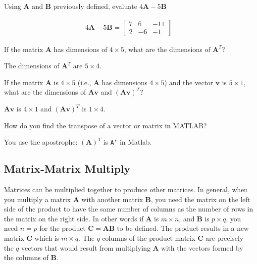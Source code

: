 \begin{prob}
Using $\mathbf{A}$ and $\mathbf{B}$ previously defined, evaluate $4\mathbf{A} - 5\mathbf{B}$
\end{prob}
\begin{sol}
\begin{align}4\mathbf{A} - 5\mathbf{B} =
\begin{bmatrix}
7 & 6 & -11\\
2 & -6 & -1
\end{bmatrix}
\end{align}
\end{sol}
\begin{prob}
If the matrix $\mathbf{A}$ has dimensions of $4\times 5$, what are the dimensions of $\mathbf{A}^T$?
\end{prob}
\begin{sol}
The dimensions of $\mathbf{A}^T$ are $5 \times 4$.
\end{sol}
\begin{prob}
If the matrix $\mathbf{A}$ is $4\times 5$ (i.e., $\mathbf{A}$ has dimensions $4 \times 5$) and the vector $\mathbf{v}$ is $5\times 1$, what are the dimensions of $\mathbf{Av}$ and $(\mathbf{Av})^T$?
\end{prob}
\begin{sol}
$\mathbf{Av}$ is $4 \times 1$ and $(\mathbf{Av})^T$ is $1 \times 4$.
\end{sol}
\begin{prob}
How do you find the transpose of a vector or matrix in MATLAB?
\end{prob}
\begin{sol}
You use the apostrophe: $(\mathbf{A})^T$ is \texttt{A'} in Matlab.
\end{sol}


\subsection{Matrix-Matrix Multiply}

Matrices can be multiplied together to produce other matrices. In general, when you multiply a matrix $\mathbf{A}$ with another matrix $\mathbf{B}$, you need the matrix on the left side of the product to have the same number of columns as the number of rows in the matrix on the right side. In other words if $\mathbf{A}$ is $m\times n$, and $\mathbf{B}$ is $p\times q$, you need $n = p$ for the product $\mathbf{C} = \mathbf{AB}$ to be defined. The product results in a new matrix $\mathbf{C}$ which is $m\times q$. The $q$ columns of the product matrix $\mathbf{C}$ are precisely the $q$ vectors that would result from multiplying $\mathbf{A}$ with the vectors formed by the columns of $\mathbf{B}$.

